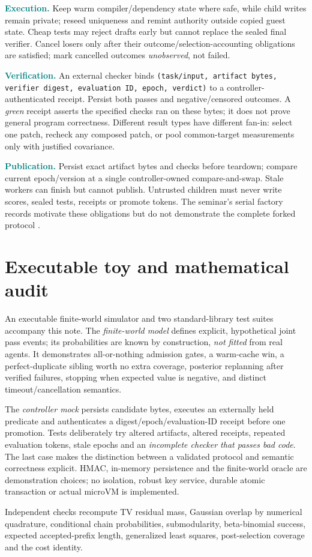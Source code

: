 \documentclass[10pt,twocolumn]{article}
\newcommand{\Claim}[1]{\noindent\textcolor{teal}{\textbf{#1}}\;}
\newcommand{\1}{\mathbf{1}}
\begin{document}
\Claim{Execution.} Keep warm compiler/dependency state where safe, while child writes remain private; reseed uniqueness and remint authority outside copied guest state. Cheap tests may reject drafts early but cannot replace the sealed final verifier. Cancel losers only after their outcome/selection-accounting obligations are satisfied; mark cancelled outcomes \emph{unobserved}, not failed.

\Claim{Verification.} An external checker binds \texttt{(task/input, artifact bytes, verifier digest, evaluation ID, epoch, verdict)} to a controller-authenticated receipt. Persist both passes and negative/censored outcomes. A \emph{green} receipt asserts the specified checks ran on these bytes; it does not prove general program correctness. Different result types have different fan-in: select one patch, recheck any composed patch, or pool common-target measurements only with justified covariance.

\Claim{Publication.} Persist exact artifact bytes and checks before teardown; compare current epoch/version at a single controller-owned compare-and-swap. Stale workers can finish but cannot publish. Untrusted children must never write scores, sealed tests, receipts or promote tokens. The seminar's serial factory records motivate these obligations but do not demonstrate the complete forked protocol \cite{cam}.

\section{Executable toy and mathematical audit}
An executable finite-world simulator and two standard-library test suites accompany this note. The \emph{finite-world model} defines explicit, hypothetical joint pass events; its probabilities are known by construction, \emph{not fitted} from real agents. It demonstrates all-or-nothing admission gates, a warm-cache win, a perfect-duplicate sibling worth no extra coverage, posterior replanning after verified failures, stopping when expected value is negative, and distinct timeout/cancellation semantics.

The \emph{controller mock} persists candidate bytes, executes an externally held predicate and authenticates a digest/epoch/evaluation-ID receipt before one promotion. Tests deliberately try altered artifacts, altered receipts, repeated evaluation tokens, stale epochs and an \emph{incomplete checker that passes bad code}. The last case makes the distinction between a validated protocol and semantic correctness explicit. HMAC, in-memory persistence and the finite-world oracle are demonstration choices; no isolation, robust key service, durable atomic transaction or actual microVM is implemented.\par
Independent checks recompute TV residual mass, Gaussian overlap by numerical quadrature, conditional chain probabilities, submodularity, beta-binomial success, expected accepted-prefix length, generalized least squares, post-selection coverage and the cost identity.
\end{document}
